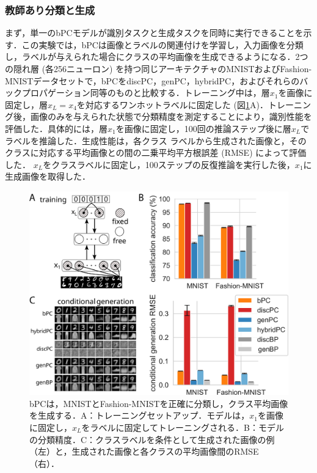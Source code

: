 \documentclass[a4paper, titlepage]{jsarticle}
\begin{document}
\subsubsection{教師あり分類と生成}
まず，単一のbPCモデルが識別タスクと生成タスクを同時に実行できることを示す．この実験では，bPCは画像とラベルの関連付けを学習し，入力画像を分類し，ラベルが与えられた場合にクラスの平均画像を生成できるようになる．2つの隠れ層 (各256ニューロン) を持つ同じアーキテクチャのMNISTおよびFashion-MNISTデータセットで，bPCをdiscPC，genPC，hybridPC，およびそれらのバックプロパゲーション同等のものと比較する．トレーニング中は，層$x_1$を画像に固定し，層\;$x_L=x_4$\;を対応するワンホットラベルに固定した (図\ref{ex_result1}A)．トレーニング後，画像のみを与えられた状態で分類精度を測定することにより，識別性能を評価した．具体的には，層$x_1$を画像に固定し，100回の推論ステップ後に層$x_L$でラベルを推論した．生成性能は，各クラス ラベルから生成された画像と，そのクラスに対応する平均画像との間の二乗平均平方根誤差 (RMSE) によって評価した． $x_L$をクラスラベルに固定し，100ステップの反復推論を実行した後，$x_1$に生成画像を取得した．
\begin{figure}[htbp]
   \centering
   \includegraphics[scale=0.2]{x3.png}
   \caption{bPCは，MNISTとFashion-MNISTを正確に分類し，クラス平均画像を生成する．A：トレーニングセットアップ．モデルは，$x_1$を画像に固定し，$x_L$をラベルに固定してトレーニングされる．B：モデルの分類精度．C：クラスラベルを条件として生成された画像の例（左）と，生成された画像と各クラスの平均画像間のRMSE（右）．}
   \label{ex_result1}
\end{figure} \\
\end{document}
